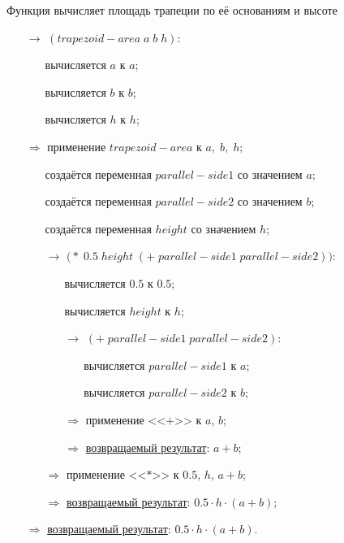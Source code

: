 \newpage
\problem Функция вычисляет площадь трапеции по её основаниям и высоте\\[0.1cm]


\begin{itemize}
	\item[$\longrightarrow$] $(trapezoid\!-\!area\; a\; b\; h)$:
	\begin{itemize}
		\item[\textbullet] вычисляется $a$ к $a$;
		\item[\textbullet] вычисляется $b$ к $b$;
		\item[\textbullet] вычисляется $h$ к $h$;
	\end{itemize}
	\item[$\Longrightarrow$] применение $trapezoid\!-\!area$ к $a,\; b,\; h$;
	\begin{itemize}
		\item[\textbullet] создаётся переменная $parallel\!-\!side1$ со значением $a$;
		\item[\textbullet] создаётся переменная $parallel\!-\!side2$ со значением $b$;
		\item[\textbullet] создаётся переменная $height$ со значением $h$;
		\item[$\longrightarrow$] $\bigl(*\; 0.5\; height\; (+\; parallel\!-\!side1\; parallel\!-\!side2)\bigr)$:
		\begin{itemize}
			\item[\textbullet] вычисляется $0.5$ к $0.5$;
			\item[\textbullet] вычисляется $height$ к $h$;
			\item[$\longrightarrow$] $(+\; parallel\!-\!side1\; parallel\!-\!side2)$:
			\begin{itemize}
				\item[\textbullet] вычисляется $parallel\!-\!side1$ к $a$;
				\item[\textbullet] вычисляется $parallel\!-\!side2$ к $b$;
			\end{itemize}
			\item[$\Longrightarrow$] применение <<$+$>> к $a$, $b$;
			\item[$\Longrightarrow$] \underline{возвращаемый результат}: $a + b$;
		\end{itemize}
		\item[$\Longrightarrow$] применение <<$*$>> к $0.5$, $h$, $a + b$;
		\item[$\Longrightarrow$] \underline{возвращаемый результат}: $0.5 \cdot h \cdot (a + b)$;
	\end{itemize}
	\item[$\Longrightarrow$] \underline{возвращаемый результат}: $0.5 \cdot h \cdot (a + b)$.
\end{itemize}



